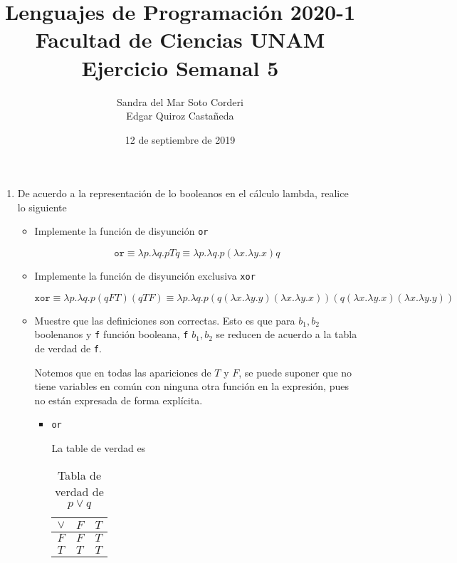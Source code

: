\documentclass{article}
\title{
    Lenguajes de Programación 2020-1 \\
    Facultad de Ciencias UNAM \\
    Ejercicio Semanal 5
}
\author{
    Sandra del Mar Soto Corderi \\
    Edgar Quiroz Castañeda
}
\date{
    12 de septiembre de 2019
}
\begin{document}
    \maketitle
    \begin{enumerate}
        \item {
            De acuerdo a la representación de lo booleanos en el cálculo lambda,
            realice lo siguiente
            \begin{itemize}
                \item {
                    Implemente la función de disyunción \texttt{or}

                    \[
                        \texttt{or} \equiv 
                        \lambda p. \lambda q. p T q
                        \equiv \lambda p. \lambda q. p (\lambda x. \lambda y. x) q 
                    \]
                }
                \item {
                    Implemente la función de disyunción exclusiva \texttt{xor}

                    \[
                        \texttt{xor} \equiv 
                        \lambda p. \lambda q. p (q F T) (q T F)
                        \equiv \lambda p. \lambda q. p 
                        (q (\lambda x. \lambda y. y) (\lambda x. \lambda y. x)) 
                        (q (\lambda x. \lambda y. x) (\lambda x. \lambda y. y))
                    \]
                }
                \item {
                    Muestre que las definiciones son correctas. Esto es que para
                    $b_1, b_2$ boolenanos y \texttt{f} función booleana,
                    \texttt{f} $b_1, b_2$ se reducen de acuerdo a la tabla de
                    verdad de \texttt{f}.

                    Notemos que en todas las apariciones de $T$ y $F$, se puede
                    suponer que no tiene variables en común con ninguna otra
                    función en la expresión, pues no están expresada de forma
                    explícita.
                    \begin{itemize}
                        \item {
                            \texttt{or}

                            La table de verdad es 

                            \begin{table}[H]
                                \centering
                                \begin{tabular}{|l|l|l|}
                                    \hline
                                    $\lor$ & $F$ & $T$ \\ \hline
                                    $F$    & $F$ & $T$ \\ \hline
                                    $T$    & $T$ & $T$ \\ \hline
                                \end{tabular}
                                \caption{Tabla de verdad de $p \lor q$}
                                \label{tab:truth_or}
                            \end{table}

}
\end{itemize}}
\end{itemize}}
\end{enumerate}
\end{document}
